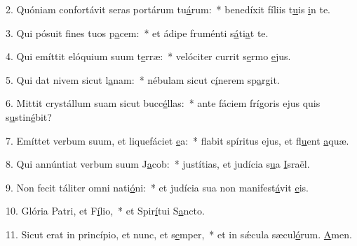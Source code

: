 2. Quóniam confortávit seras portárum tu\uline{á}rum:~* benedíxit fíliis t\uline{u}is \uline{i}n te.\par 
3. Qui pósuit fines tuos p\uline{a}cem:~* et ádipe fruménti s\uline{á}ti\uline{a}t te.\par 
4. Qui emíttit elóquium suum t\uline{e}rræ:~* velóciter currit s\uline{e}rmo \uline{e}jus.\par 
5. Qui dat nivem sicut l\uline{a}nam:~* nébulam sicut c\uline{í}nerem sp\uline{a}rgit.\par 
6. Mittit crystállum suam sicut bucc\uline{é}llas:~* ante fáciem frígoris ejus quis s\uline{u}stin\uline{é}bit?\par 
7. Emíttet verbum suum, et liquefáciet \uline{e}a:~* flabit spíritus ejus, et fl\uline{u}ent \uline{a}quæ.\par 
8. Qui annúntiat verbum suum J\uline{a}cob:~* justítias, et judícia s\uline{u}a \uline{I}sraël.\par 
9. Non fecit táliter omni nati\uline{ó}ni:~* et judícia sua non manifest\uline{á}vit \uline{e}is.\par 
10. Glória Patri, et F\uline{í}lio,~* et Spir\uline{í}tui S\uline{a}ncto.\par 
11. Sicut erat in princípio, et nunc, et s\uline{e}mper,~* et in sǽcula sæcul\uline{ó}rum. \uline{A}men.\par 
